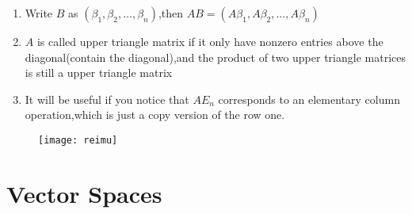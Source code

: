 \documentclass{article}
\begin{document}
\begin{thm}
	\begin{enumerate}
		\item Write $B$ as $(\beta_1,\beta_2,\dots,\beta_n)$,then $AB=(A\beta_1,A\beta_2,\dots,A\beta_n)$
		\item $A$ is called upper triangle matrix if it only have nonzero entries above the diagonal(contain the diagonal),and the product of two upper triangle matrices is still a upper triangle matrix
		\item It will be useful if you notice that $AE_n$ corresponds to an elementary column operation,which is just a copy version of the row one. 
	\end{enumerate}
\end{thm}
\begin{figure}[htbp]
	\centering
	\texttt{[image: reimu]}
\end{figure}
\newpage
\section{Vector Spaces}
\end{document}
